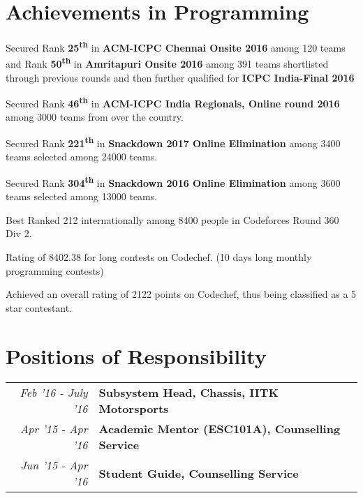 \documentclass[a4paper]{norm-resume}
\begin{document}
\vspace{2mm}    %


\section{Achievements in Programming \hrulefill}

\vspace{2mm} %

\begin{tightitemize}
    \small
    {
    \item Secured Rank \textbf{25\textsuperscript{th}} in \textbf{ACM-ICPC Chennai Onsite 2016} among 120 teams and Rank \textbf{50\textsuperscript{th}} in \textbf{Amritapuri Onsite 2016} among 391 teams shortlisted through previous rounds and then further qualified for \textbf{ICPC India-Final 2016}
    \item Secured Rank \textbf{46\textsuperscript{th}} in \textbf{ACM-ICPC India Regionals, Online round 2016} among 3000 teams from over the country.
    \item Secured Rank \textbf{221\textsuperscript{th}} in \textbf{Snackdown 2017 Online Elimination} among 3400 teams selected among 24000 teams.
    \item Secured Rank \textbf{304\textsuperscript{th}} in \textbf{Snackdown 2016 Online Elimination} among 3600 teams selected among 13000 teams.
    \item Best Ranked 212 internationally among 8400 people in Codeforces Round 360 Div 2.
    \item Rating of 8402.38 for long contests on Codechef. (10 days long monthly programming contests)
    \item Achieved an overall rating of 2122 points on Codechef, thus being classified as a 5 star contestant.
    }
\end{tightitemize}


\section{Positions of Responsibility \hrulefill}

    \begin{tabular}{r|p{16cm}}

    \normalsize\emph{Feb '16 - July '16} & \normalsize\textbf{Subsystem Head, Chassis, IITK Motorsports}\\
    \normalsize\emph{Apr '15 - Apr '16} & \normalsize\textbf{Academic Mentor (ESC101A), Counselling Service}\\
    \normalsize\emph{Jun '15 - Apr '16} & \normalsize\textbf{Student Guide, Counselling Service}
    \end{tabular}
\end{document}
